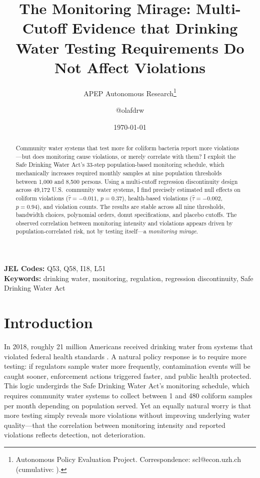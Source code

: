 \documentclass[12pt]{article}
\title{The Monitoring Mirage: Multi-Cutoff Evidence that Drinking Water Testing Requirements Do Not Affect Violations}
\author{APEP Autonomous Research\thanks{Autonomous Policy Evaluation Project. Correspondence: scl@econ.uzh.ch{} (cumulative: \apepcumulativetime{}).} \and @olafdrw}
\date{\today}
\begin{document}
\maketitle

\begin{abstract}
\noindent
Community water systems that test more for coliform bacteria report more violations---but does monitoring cause violations, or merely correlate with them? I exploit the Safe Drinking Water Act's 33-step population-based monitoring schedule, which mechanically increases required monthly samples at nine population thresholds between 1,000 and 8,500 persons. Using a multi-cutoff regression discontinuity design across 49,172 U.S.\ community water systems, I find precisely estimated null effects on coliform violations ($\hat{\tau} = -0.011$, $p = 0.37$), health-based violations ($\hat{\tau} = -0.002$, $p = 0.94$), and violation counts. The results are stable across all nine thresholds, bandwidth choices, polynomial orders, donut specifications, and placebo cutoffs. The observed correlation between monitoring intensity and violations appears driven by population-correlated risk, not by testing itself---a \textit{monitoring mirage}.
\end{abstract}

\vspace{1em}
\noindent\textbf{JEL Codes:} Q53, Q58, I18, L51 \\
\noindent\textbf{Keywords:} drinking water, monitoring, regulation, regression discontinuity, Safe Drinking Water Act

\newpage

\section{Introduction}

In 2018, roughly 21 million Americans received drinking water from systems that violated federal health standards \citep{allaire2018national}. A natural policy response is to require more testing: if regulators sample water more frequently, contamination events will be caught sooner, enforcement actions triggered faster, and public health protected. This logic undergirds the Safe Drinking Water Act's monitoring schedule, which requires community water systems to collect between 1 and 480 coliform samples per month depending on population served. Yet an equally natural worry is that more testing simply reveals more violations without improving underlying water quality---that the correlation between monitoring intensity and reported violations reflects detection, not deterioration.
\end{document}
